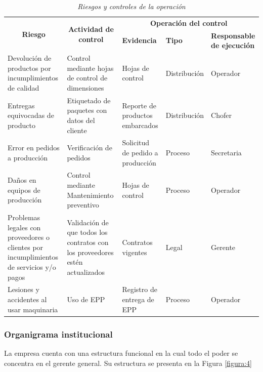 \documentclass[12pt, a4paper]{article}
\begin{document}
\begin{table}[H]
\centering
\caption{\textit{{Riesgos y controles de la operación}}}
\label{tabla:Riesgos}
\begin{tabular}{|p{3cm}|p{3.5cm}|p{2cm}|p{2.5cm}|p{2.5cm}|}
\hline
\multicolumn{1}{|c|}{\multirow{2}{3cm}{\textbf{Riesgo}}} & \multicolumn{1}{c|}{\multirow{2}{3.5cm}{\textbf{Actividad de control}}} & \multicolumn{3}{c|}{\textbf{Operación del control}} \\ \cline{3-5} 
\multicolumn{1}{|c|}{} & \multicolumn{1}{c|}{} & \textbf{Evidencia} & \textbf{Tipo} & \textbf{Responsable de ejecución} \\ \hline
Devolución de productos por incumplimientos de calidad & Control mediante hojas de control de dimensiones & Hojas de control & Distribución & Operador \\ \hline
Entregas equivocadas de producto & Etiquetado de paquetes con datos del cliente & Reporte de productos embarcados & Distribución & Chofer \\ \hline
Error en pedidos a producción & Verificación de pedidos & Solicitud de pedido a producción & Proceso & Secretaria \\ \hline
Daños en equipos de producción & Control mediante Mantenimiento preventivo & Hojas de control & Proceso & Operador \\ \hline
Problemas legales con proveedores o clientes por incumplimientos de servicios y/o pagos & Validación de que todos los contratos con los proveedores estén actualizados & Contratos vigentes & Legal & Gerente \\ \hline
Lesiones y accidentes al usar maquinaria & Uso de EPP & Registro de entrega de EPP & Proceso & Operador \\ \hline
\end{tabular}
\end{table}

\subsubsection{Organigrama institucional}
La empresa cuenta con una estructura funcional en la cual todo el poder se concentra en el gerente general. Su estructura se presenta en la Figura \ref{figura:4}
\end{document}
